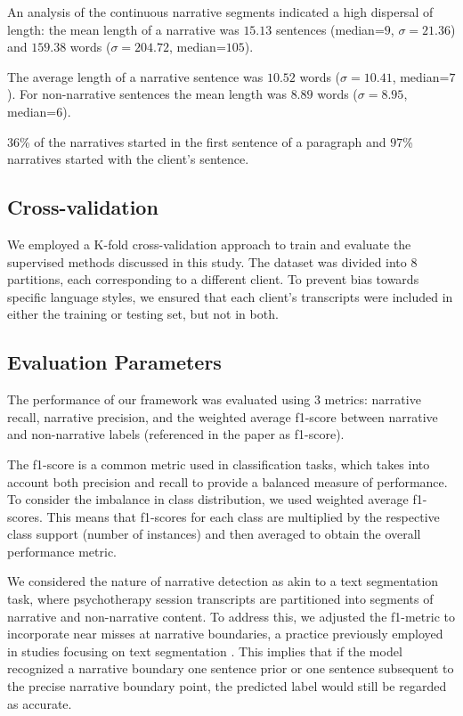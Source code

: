 \documentclass[preprint,12pt]{elsarticle}
\begin{document}
An analysis of the continuous narrative segments indicated a high dispersal of length: the mean length of a narrative was $15.13$ sentences (median=$9$, $\sigma=21.36$) and $159.38$ words ($\sigma=204.72$, median=$105$).

The average length of a narrative sentence was $10.52$ words ($\sigma=10.41$, median=$7$). For non-narrative sentences the mean length was $8.89$ words ($\sigma=8.95$, median=$6$). 

$36$\% of the narratives started in the first sentence of a paragraph and $97$\% narratives started with the client's sentence. 

\subsection{Cross-validation} \label{sec:Cross-validation}
We employed a K-fold cross-validation approach to train and evaluate the supervised methods discussed in this study. The dataset was divided into $8$ partitions, each corresponding to a different client. To prevent bias towards specific language styles, we ensured that each client's transcripts were included in either the training or testing set, but not in both. 

\subsection{Evaluation Parameters} \label{sec:Evaluation Parameters}
The performance of our framework was evaluated using $3$ metrics: narrative recall, narrative precision, and the weighted average f1-score between narrative and non-narrative labels (referenced in the paper as f1-score). 

The f1-score is a common metric used in classification tasks, which takes into account both precision and recall to provide a balanced measure of performance. To consider the imbalance in class distribution, we used weighted average f1-scores. This means that f1-scores for each class are multiplied by the respective class support (number of instances) and then averaged to obtain the overall performance metric.

We considered the nature of narrative detection as akin to a text segmentation task, where psychotherapy session transcripts are partitioned into segments of narrative and non-narrative content. To address this, we adjusted the f1-metric to incorporate near misses at narrative boundaries, a practice previously employed in studies focusing on text segmentation \cite{Fournier2013a}. This implies that if the model recognized a narrative boundary one sentence prior or one sentence subsequent to the precise narrative boundary point, the predicted label would still be regarded as accurate.
\end{document}
